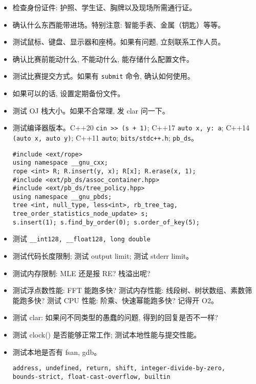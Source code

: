 \begin{small}
\begin{itemize}[leftmargin=1mm]
    \setlength{\itemsep}{0pt}
    \setlength{\parskip}{0.5pt}
    \item 检查身份证件: 护照、学生证、胸牌以及现场所需通行证。
    \item 确认什么东西能带进场。特别注意: 智能手表、金属（钥匙）等等。
    \item 测试鼠标、键盘、显示器和座椅。如果有问题, 立刻联系工作人员。
    \item 确认比赛前能动什么, 不能动什么, 能存储什么配置文件。
    \item 测试比赛提交方式。如果有 \texttt{submit} 命令, 确认如何使用。
    \item 如果可以的话, 设置定期备份文件。
    \item 测试 OJ 栈大小。如果不合常理, 发 clar 问一下。
    \item 测试编译器版本。C++20 \texttt{cin >> (s + 1)}; C++17 \texttt{auto \lbrack x, y\rbrack : a}; C++14 \texttt{\lbrack \rbrack (auto x, auto y)}; C++11 \texttt{auto}; \texttt{bits/stdc++.h}; \texttt{pb\_ds}。
\begin{verbatim}
#include <ext/rope>
using namespace __gnu_cxx;
rope <int> R; R.insert(y, x); R[x]; R.erase(x, 1);
#include <ext/pb_ds/assoc_container.hpp> 
#include <ext/pb_ds/tree_policy.hpp> 
using namespace __gnu_pbds;
tree <int, null_type, less<int>, rb_tree_tag,
tree_order_statistics_node_update> s;
s.insert(1); s.find_by_order(0); s.order_of_key(5);
\end{verbatim}
    \item 测试 \texttt{\_\_int128, \_\_float128, long double}
    \item 测试代码长度限制; 测试 output limit; 测试 stderr limit。
    \item 测试内存限制: MLE 还是报 RE? 栈溢出呢? 
    \item 测试浮点数性能: FFT 能跑多快? 测试内存性能: 线段树、树状数组、素数筛能跑多快? 测试 CPU 性能: 阶乘、快速幂能跑多快? 记得开 O2。
    \item 测试 clar: 如果问不同类型的愚蠢的问题, 得到的回复是否不一样? 
    \item 测试 clock() 是否能够正常工作; 测试本地性能与提交性能。
    \item 测试本地是否有 fsan, gdb。\begin{verbatim}
address, undefined, return, shift, integer-divide-by-zero,
bounds-strict, float-cast-overflow, builtin
\end{verbatim}

\end{itemize}
\end{small}
